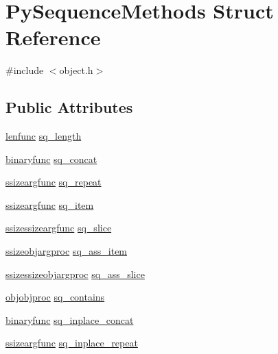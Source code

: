 \hypertarget{struct_py_sequence_methods}{}\section{Py\+Sequence\+Methods Struct Reference}
\label{struct_py_sequence_methods}


{\ttfamily \#include $<$object.\+h$>$}

\subsection*{Public Attributes}
\begin{DoxyCompactItemize}
\item 
\mbox{\hyperlink{_python27_2object_8h_a07099ee62617991d223a386bb7f09008}{lenfunc}} \mbox{\hyperlink{struct_py_sequence_methods_a065df8805c9fe2274312a52efa70461a}{sq\+\_\+length}}
\item 
\mbox{\hyperlink{_python27_2object_8h_a1a50b2d154f36acb9d215f2cdc1561a8}{binaryfunc}} \mbox{\hyperlink{struct_py_sequence_methods_af1b354d31d0f760321715a678a1ade80}{sq\+\_\+concat}}
\item 
\mbox{\hyperlink{_python27_2object_8h_a0c13a44d945e5ad963c3db8584d308cb}{ssizeargfunc}} \mbox{\hyperlink{struct_py_sequence_methods_afa5e868a77ebfd808b4286aea874230a}{sq\+\_\+repeat}}
\item 
\mbox{\hyperlink{_python27_2object_8h_a0c13a44d945e5ad963c3db8584d308cb}{ssizeargfunc}} \mbox{\hyperlink{struct_py_sequence_methods_ab8d80a68cc44c06a10a746cd5242d943}{sq\+\_\+item}}
\item 
\mbox{\hyperlink{_python27_2object_8h_ab30aa8df5679dd34d92fb2926b0da313}{ssizessizeargfunc}} \mbox{\hyperlink{struct_py_sequence_methods_ab1c2147b3135f575ebbf169ae147edfa}{sq\+\_\+slice}}
\item 
\mbox{\hyperlink{_python27_2object_8h_a77007d5606a99b15fe9ef536de7799f4}{ssizeobjargproc}} \mbox{\hyperlink{struct_py_sequence_methods_aba9bd4b6a8918934de3218a7b749cae4}{sq\+\_\+ass\+\_\+item}}
\item 
\mbox{\hyperlink{_python27_2object_8h_aec5241b3bfca13f1572340b5bbf9112e}{ssizessizeobjargproc}} \mbox{\hyperlink{struct_py_sequence_methods_aeecd41cfcc8c3af5f31bb479fc91107e}{sq\+\_\+ass\+\_\+slice}}
\item 
\mbox{\hyperlink{_python27_2object_8h_a07f4ce603d3e8e0515b0e3be042531cc}{objobjproc}} \mbox{\hyperlink{struct_py_sequence_methods_ab2fdbfcc770f5f76d9e51c9ae790a18b}{sq\+\_\+contains}}
\item 
\mbox{\hyperlink{_python27_2object_8h_a1a50b2d154f36acb9d215f2cdc1561a8}{binaryfunc}} \mbox{\hyperlink{struct_py_sequence_methods_affec621f1814e2cff5abb2d907f9bf59}{sq\+\_\+inplace\+\_\+concat}}
\item 
\mbox{\hyperlink{_python27_2object_8h_a0c13a44d945e5ad963c3db8584d308cb}{ssizeargfunc}} \mbox{\hyperlink{struct_py_sequence_methods_a6e8b51006d6635efddd6d5e03514eff8}{sq\+\_\+inplace\+\_\+repeat}}
\end{DoxyCompactItemize}


